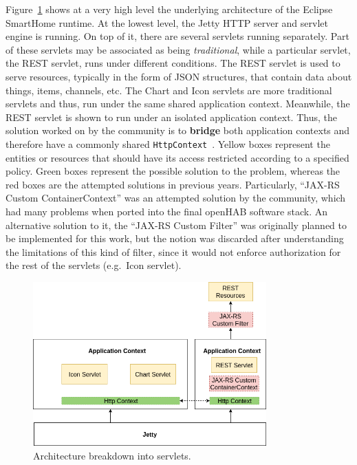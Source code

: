 \documentclass[12pt]{article}
\begin{document}
Figure~\ref{fig:esh_auth_arch} shows at a very high level the underlying architecture of the Eclipse SmartHome runtime. At the lowest level, the Jetty HTTP server and servlet engine is running. On top of it, there are several servlets running separately. Part of these servlets may be associated as being \emph{traditional}, while a particular servlet, the REST servlet, runs under different conditions. The REST servlet is used to serve resources, typically in the form of JSON structures, that contain data about things, items, channels, etc. The Chart and Icon servlets are more traditional servlets and thus, run under the same shared application context. Meanwhile, the REST servlet is shown to run under an isolated application context. Thus, the solution worked on by the community is to \textbf{bridge} both application contexts and therefore have a commonly shared \texttt{HttpContext}~\cite{esh_03}. Yellow boxes represent the entities or resources that should have its access restricted according to a specified policy. Green boxes represent the possible solution to the problem, whereas the red boxes are the attempted solutions in previous years. Particularly, ``JAX-RS Custom ContainerContext'' was an attempted solution by the community, which had many problems when ported into the final openHAB software stack. An alternative solution to it, the ``JAX-RS Custom Filter'' was originally planned to be implemented for this work, but the notion was discarded after understanding the limitations of this kind of filter, since it would not enforce authorization for the rest of the servlets (e.g.\ Icon servlet). 

\begin{figure} [ht] 
\begin{center}
\includegraphics[width=0.8\textwidth]{esh_auth_arch}
\caption{Architecture breakdown into servlets.}
\label{fig:esh_auth_arch}
\end{center}
\end{figure}
\end{document}
